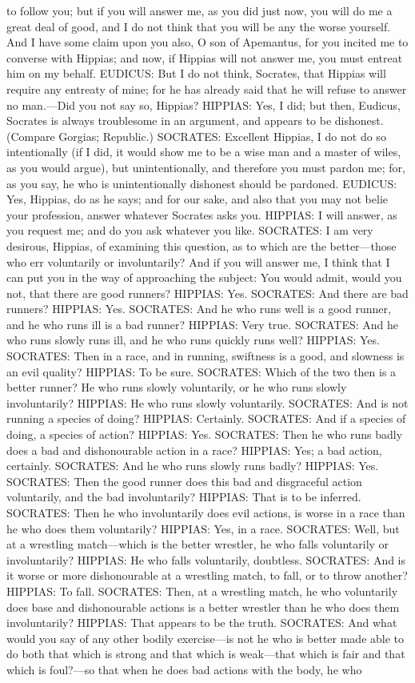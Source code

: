 \documentclass[11pt,letter]{article}
\begin{document}
to follow you; but if you will answer me, as you did just now, you will do me a great deal of good, and I do not think that you will be any the worse yourself. And I have some claim upon you also, O son of Apemantus, for you incited me to converse with Hippias; and now, if Hippias will not answer me, you must entreat him on my behalf. EUDICUS:  But I do not think, Socrates, that Hippias will require any entreaty of mine; for he has already said that he will refuse to answer no man.—Did you not say so, Hippias? HIPPIAS:  Yes, I did; but then, Eudicus, Socrates is always troublesome in an argument, and appears to be dishonest. (Compare Gorgias; Republic.) SOCRATES:  Excellent Hippias, I do not do so intentionally (if I did, it would show me to be a wise man and a master of wiles, as you would argue), but unintentionally, and therefore you must pardon me; for, as you say, he who is unintentionally dishonest should be pardoned. EUDICUS:  Yes, Hippias, do as he says; and for our sake, and also that you may not belie your profession, answer whatever Socrates asks you. HIPPIAS:  I will answer, as you request me; and do you ask whatever you like. SOCRATES:  I am very desirous, Hippias, of examining this question, as to which are the better—those who err voluntarily or involuntarily? And if you will answer me, I think that I can put you in the way of approaching the subject:  You would admit, would you not, that there are good runners? HIPPIAS:  Yes. SOCRATES:  And there are bad runners? HIPPIAS:  Yes. SOCRATES:  And he who runs well is a good runner, and he who runs ill is a bad runner? HIPPIAS:  Very true. SOCRATES:  And he who runs slowly runs ill, and he who runs quickly runs well? HIPPIAS:  Yes. SOCRATES:  Then in a race, and in running, swiftness is a good, and slowness is an evil quality? HIPPIAS:  To be sure. SOCRATES:  Which of the two then is a better runner? He who runs slowly voluntarily, or he who runs slowly involuntarily? HIPPIAS:  He who runs slowly voluntarily. SOCRATES:  And is not running a species of doing? HIPPIAS:  Certainly. SOCRATES:  And if a species of doing, a species of action? HIPPIAS:  Yes. SOCRATES:  Then he who runs badly does a bad and dishonourable action in a race? HIPPIAS:  Yes; a bad action, certainly. SOCRATES:  And he who runs slowly runs badly? HIPPIAS:  Yes. SOCRATES:  Then the good runner does this bad and disgraceful action voluntarily, and the bad involuntarily? HIPPIAS:  That is to be inferred. SOCRATES:  Then he who involuntarily does evil actions, is worse in a race than he who does them voluntarily? HIPPIAS:  Yes, in a race. SOCRATES:  Well, but at a wrestling match—which is the better wrestler, he who falls voluntarily or involuntarily? HIPPIAS:  He who falls voluntarily, doubtless. SOCRATES:  And is it worse or more dishonourable at a wrestling match, to fall, or to throw another? HIPPIAS:  To fall. SOCRATES:  Then, at a wrestling match, he who voluntarily does base and dishonourable actions is a better wrestler than he who does them involuntarily? HIPPIAS:  That appears to be the truth. SOCRATES:  And what would you say of any other bodily exercise—is not he who is better made able to do both that which is strong and that which is weak—that which is fair and that which is foul?—so that when he does bad actions with the body, he who 
\end{document}
